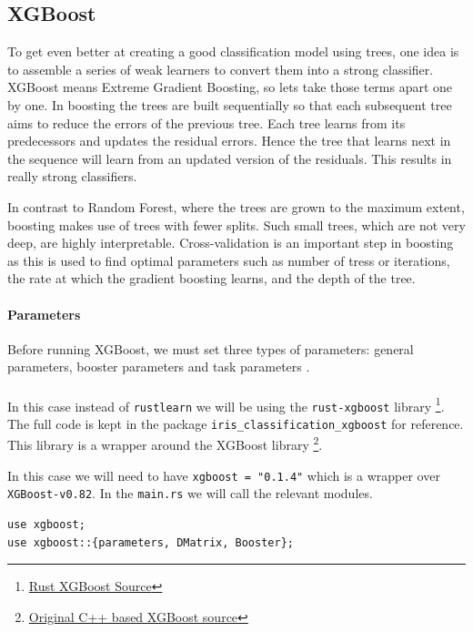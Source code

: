 \documentclass{book}
\begin{document}
\subsection{XGBoost}%
To get even better at creating a good classification model using trees, one idea is to assemble a series of weak learners to convert them into a strong classifier. XGBoost means Extreme Gradient Boosting, so lets take those terms apart one by one. In boosting the trees are built sequentially so that each subsequent tree aims to reduce the errors of the previous tree. Each tree learns from its predecessors and updates the residual errors. Hence the tree that learns next in the sequence will learn from an updated version of the residuals. This results in really strong classifiers\cite{WEBSITE:12}.

In contrast to Random Forest, where the trees are grown to the maximum extent, boosting makes use of trees with fewer splits. Such small trees, which are not very deep, are highly interpretable. Cross-validation is an important step in boosting as this is used to find optimal parameters such as number of tress or iterations, the rate at which the gradient boosting learns, and the depth of the tree.

\paragraph{Parameters}%
Before running XGBoost, we must set three types of parameters: general parameters, booster parameters and task parameters\cite{Chen:2016:XST:2939672.2939785} .

\paragraph{}%
In this case instead of \lstinline{rustlearn} we will be using the \lstinline{rust-xgboost} library \footnote{\href{https://github.com/davechallis/rust-xgboost}{Rust XGBoost Source}}. The full code is kept in the package \lstinline{iris_classification_xgboost} for reference. This library is a wrapper around the XGBoost library \footnote{\href{https://github.com/dmlc/xgboost/}{Original C++ based XGBoost source}}.

In this case we will need to have \lstinline{xgboost = "0.1.4"} which is a wrapper over \lstinline{XGBoost-v0.82}. In the \lstinline{main.rs} we will call the relevant modules.

\begin{lstlisting}[caption={chapter3\\/iris\_classification\_xgboost\\/src\\/main\\.rs}]
use xgboost;
use xgboost::{parameters, DMatrix, Booster};
\end{lstlisting}
\end{document}
